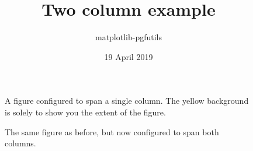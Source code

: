 \documentclass[twocolumn]{article}
\title{Two column example}
\author{matplotlib-pgfutils}
\date{19 April 2019}
\begin{document}
\maketitle

\lipsum[1-8]

\begin{figure}
  
  \caption{A figure configured to span a single column. The yellow background
  is solely to show you the extent of the figure.}
\end{figure}

\begin{figure*}
  
  \caption{The same figure as before, but now configured to span both columns.}
\end{figure*}

\lipsum[9-14]
\end{document}
